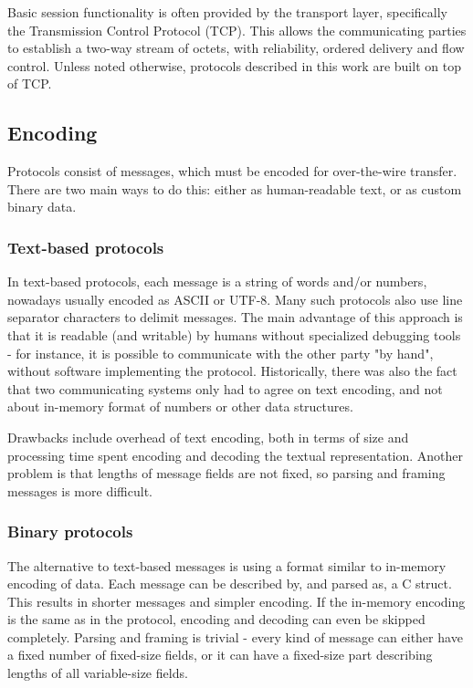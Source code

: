 Basic session functionality is often provided by the transport layer, specifically the Transmission Control
Protocol (TCP). This allows the communicating parties to establish a two-way stream of octets, with
reliability, ordered delivery and flow control. Unless noted otherwise, protocols described in this work are
built on top of TCP.


\subsection{Encoding}

Protocols consist of messages, which must be encoded for over-the-wire transfer. There are two main ways to do
this: either as human-readable text, or as custom binary data.

\subsubsection{Text-based protocols}

In text-based protocols, each message is a string of words and/or numbers, nowadays usually encoded as ASCII
or UTF-8. Many such protocols also use line separator characters to delimit messages. The main advantage of
this approach is that it is readable (and writable) by humans without specialized debugging tools - for
instance, it is possible to communicate with the other party "by hand", without software implementing the
protocol. Historically, there was also the fact that two communicating systems only had to agree on text
encoding, and not about in-memory format of numbers or other data structures.

Drawbacks include overhead of text encoding, both in terms of size and processing time spent encoding and
decoding the textual representation. Another problem is that lengths of message fields are not fixed, so
parsing and framing messages is more difficult.

\subsubsection{Binary protocols}

The alternative to text-based messages is using a format similar to in-memory encoding of data. Each message
can be described by, and parsed as, a C struct\footnotemark[2]. This results in shorter messages and simpler
encoding. If the in-memory encoding is the same as in the protocol, encoding and decoding can even be skipped
completely. Parsing and framing is trivial - every kind of message can either have a fixed number of
fixed-size fields, or it can have a fixed-size part describing lengths of all variable-size fields.

